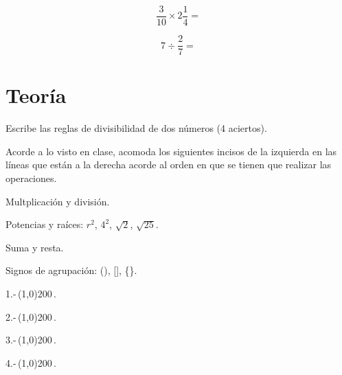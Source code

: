 \documentclass[11pt]{article}
\begin{document}
\begin{equation}
    \frac{3}{10}  \times 2\frac{1}{4} = \nonumber
\end{equation}

\vspace{2.5cm}

\begin{equation}
    7 \div \frac{2}{7} = \nonumber
\end{equation}

\vspace{2.5cm}

\section{Teor\'ia}

Escribe las reglas de divisibilidad de dos n\'umeros (4 aciertos).

\vspace{2.5cm}

Acorde a lo visto en clase, acomoda los siguientes incisos de la izquierda en
las l\'ineas que est\'an a la derecha acorde al orden en que se tienen que
realizar las operaciones.

\vspace{1cm}

\begin{minipage}[t]{0.5\textwidth}
Multplicaci\'on y divisi\'on.

Potencias y ra\'ices: $r^{2}$, $4^{2}$, $\sqrt{2}$, $\sqrt{25}$.

Suma y resta.

Signos de agrupaci\'on: (), [], \{\}.

\end{minipage}
\begin{minipage}[t]{0.5\textwidth}

1.-\,\line(1,0){200}\,.

\vspace{3mm}

2.-\,\line(1,0){200}\,.

\vspace{3mm}

3.-\,\line(1,0){200}\,.

\vspace{3mm}

4.-\,\line(1,0){200}\,.

\vspace{3mm}


\end{minipage}
\end{document}
